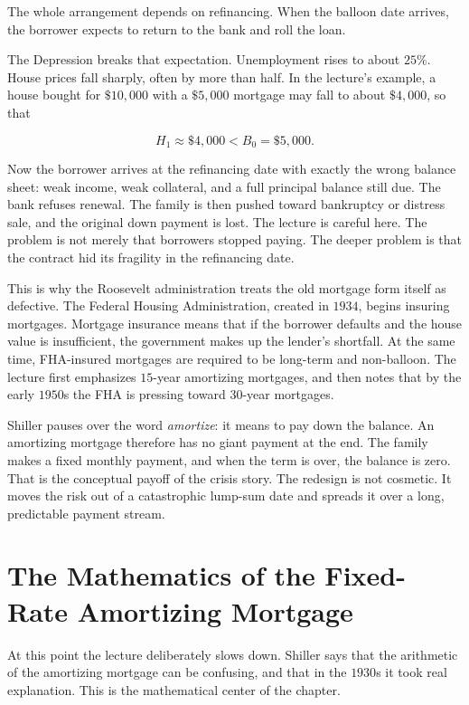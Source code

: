The whole arrangement depends on refinancing. When the balloon date arrives, the borrower expects to return to the bank and roll the loan.

The Depression breaks that expectation. Unemployment rises to about \(25\%\). House prices fall sharply, often by more than half. In the lecture's example, a house bought for \(\$10{,}000\) with a \(\$5{,}000\) mortgage may fall to about \(\$4{,}000\), so that

\begin{equation}
H_1 \approx \$4{,}000 < B_0 = \$5{,}000.
\end{equation}

Now the borrower arrives at the refinancing date with exactly the wrong balance sheet: weak income, weak collateral, and a full principal balance still due. The bank refuses renewal. The family is then pushed toward bankruptcy or distress sale, and the original down payment is lost. The lecture is careful here. The problem is not merely that borrowers stopped paying. The deeper problem is that the contract hid its fragility in the refinancing date.

This is why the Roosevelt administration treats the old mortgage form itself as defective. The Federal Housing Administration, created in \(1934\), begins insuring mortgages. Mortgage insurance means that if the borrower defaults and the house value is insufficient, the government makes up the lender's shortfall. At the same time, FHA-insured mortgages are required to be long-term and non-balloon. The lecture first emphasizes \(15\)-year amortizing mortgages, and then notes that by the early \(1950\)s the FHA is pressing toward \(30\)-year mortgages.

Shiller pauses over the word \emph{amortize}: it means to pay down the balance. An amortizing mortgage therefore has no giant payment at the end. The family makes a fixed monthly payment, and when the term is over, the balance is zero. That is the conceptual payoff of the crisis story. The redesign is not cosmetic. It moves the risk out of a catastrophic lump-sum date and spreads it over a long, predictable payment stream.

\section{The Mathematics of the Fixed-Rate Amortizing Mortgage}

At this point the lecture deliberately slows down. Shiller says that the arithmetic of the amortizing mortgage can be confusing, and that in the \(1930\)s it took real explanation. This is the mathematical center of the chapter.

